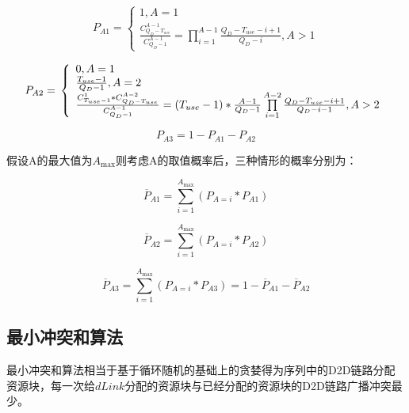 \documentclass[figurelist,tablelist,algorithmlist,nomlist,masters]{seuthesix}
\begin{document}
	
	\begin{equation}\label{eq3.1}
	{P_{A1}} = \left\{ \begin{array}{l}
	1,A = 1\\
	\frac{{C_{{Q_D} - {T_{use}}}^{A - 1}}}{{C_{{Q_D} - 1}^{A - 1}}} = \prod\limits_{i = 1}^{A - 1} {\frac{{{Q_D} - {T_{use}} - i + 1}}{{{Q_D} - i}},A > 1}
	\end{array} \right.
	\end{equation}
	
	\begin{equation}\label{eq3.1}
	{P_{A2}} = {\rm{ }}\left\{ \begin{array}{l}
	0,A = 1\\
	\frac{{{T_{use}} - 1}}{{{Q_D} - 1}},A = 2\\
	\frac{{C_{{T_{use}} - 1}^1*C_{{Q_D} - {T_{use}}}^{A - 2}}}{{C_{{Q_D} - 1}^{A - 1}}} = ({T_{use}} - 1)*\frac{{A - 1}}{{{Q_D} - 1}}\prod\limits_{i = 1}^{A - 2} {\frac{{{Q_D} - {T_{use}} - i + 1}}{{{Q_D} - i - 1}},A > 2}
	\end{array} \right.
	\end{equation}
	
	\begin{equation}\label{eq3.1}
	P_{A3} = 1 - P_{A1} - P_{A2}
	\end{equation}
	
	假设A的最大值为${A_{\max }}$则考虑A的取值概率后，三种情形的概率分别为：
	
	\begin{equation}\label{eq3.1}
	{\overline P_{A1}} = \sum\limits_{i = 1}^{{A_{\max }}} {({P_{A = i}}*P_{A1})}
	\end{equation}
	
	\begin{equation}\label{eq3.1}
	{\overline P_{A2}} = \sum\limits_{i = 1}^{{A_{\max }}} {({P_{A = i}}*{P_{A2}})}
	\end{equation}
	
	\begin{equation}\label{eq3.1}
	{\overline P_{A3}} = \sum\limits_{i = 1}^{{A_{\max }}} {({P_{A = i}}*{P_{A3}}) = } 1 - {\overline P_{A1}} - {\overline P_{A2}}
	\end{equation}
	
	\subsection{最小冲突和算法}
	最小冲突和算法相当于基于循环随机的基础上的贪婪得为序列中的D2D链路分配资源块，每一次给$dLink$分配的资源块与已经分配的资源块的D2D链路广播冲突最少。
	
\end{document}
